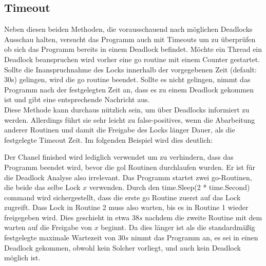 \subsection{Timeout}
Neben diesen beiden Methoden, die vorausschauend nach möglichen Deadlocks 
Ausschau halten, versucht das Programm auch mit Timeouts um zu überprüfen ob 
sich das Programm bereits in einem Deadlock befindet. Möchte ein Thread ein 
Deadlock beanspruchen wird vorher eine go routine mit einem Counter gestartet.
Sollte die Inanspruchnahme des Locks innerhalb der vorgegebenen Zeit 
(default: 30s) gelingen, wird die go routine beendet. Sollte es nicht gelingen,
nimmt das Programm nach der festgelegten Zeit an, dass es zu einem Deadlock 
gekommen ist und gibt eine entsprechende Nachricht aus.\\
Diese Methode kann
durchaus nützlich sein, um über Deadlocks informiert zu werden. Allerdings führt
sie sehr leicht zu false-positives, wenn die Abarbeitung anderer Routinen und 
damit die Freigabe des Locks länger Dauer, als die festgelegte Timeout Zeit.
Im folgenden Beispiel wird dies deutlich:
\begin{figure}[H]
    
\end{figure}
Der Chanel finished wird lediglich verwendet um zu verhindern, dass das Programm 
beendet wird, bevor die gol Routinen durchlaufen wurden. Er ist für die Deadlock
Analyse also irrelevant. Das Programm startet zwei go-Routinen, die beide das 
selbe Lock $x$ verwenden. Durch den time.Sleep(2 * time.Second) command wird 
sichergestellt, dass die erste go Routine zuerst auf das Lock zugreift. 
Dass Lock in Routine 2 muss also warten, bis es in Routine 1 wieder freigegeben
wird. Dies geschieht in etwa $38 s$ nachdem die zweite Routine mit dem warten 
auf die Freigabe von $x$ beginnt. Da dies länger ist als die standardmäßig
festgelegte maximale Wartezeit von $30 s$ nimmt das Programm an, es sei in einen 
Deadlock gekommen, obwohl kein Solcher vorliegt, und auch kein Deadlock möglich 
ist.

